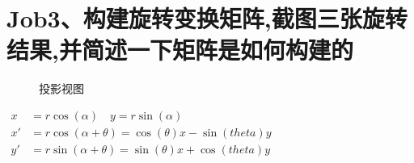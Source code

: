 \documentclass[a4paper,12pt]{article}
\begin{document}
\section{\kaishu Job3、构建旋转变换矩阵,截图三张旋转结果,并简述一下矩阵是如何构建的}
\begin{figure}[H]
    \centering
    \caption{投影视图}
\end{figure}
\begin{center}
    \begin{math}
        \begin{aligned}
            x  & =r\cos (\alpha)\quad y=r\sin(\alpha)             \\
            x' & =r\cos(\alpha+\theta)=\cos(\theta)x-\sin(theta)y \\
            y' & =r\sin(\alpha+\theta)=\sin(\theta)x+\cos(theta)y \\
        \end{aligned}
    \end{math}
\end{center}
\end{document}

